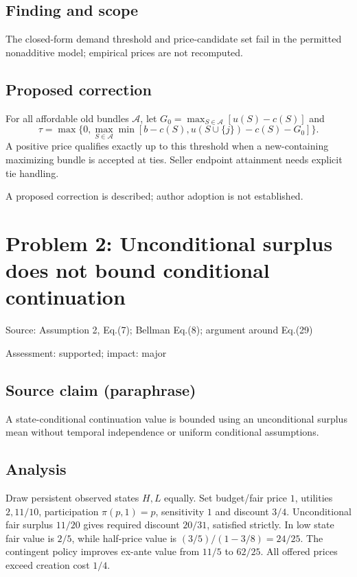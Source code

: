 \documentclass[11pt]{article}
\begin{document}
\subsection*{Finding and scope}

The closed-form demand threshold and price-candidate set fail in the permitted nonadditive model; empirical prices are not recomputed.

\subsection*{Proposed correction}

For all affordable old bundles \(\mathcal A\), let \(G_0=\max_{S\in\mathcal A}[u(S)-c(S)]\) and \[\tau=\max\{0,\max_{S\in\mathcal A}\min[b-c(S),u(S\cup\{j\})-c(S)-G_0]\}.\] A positive price qualifies exactly up to this threshold when a new-containing maximizing bundle is accepted at ties. Seller endpoint attainment needs explicit tie handling.

A proposed correction is described; author adoption is not established.

\section*{Problem 2: Unconditional surplus does not bound conditional continuation}

Source: Assumption 2, Eq.(7); Bellman Eq.(8); argument around Eq.(29)

Assessment: supported; impact: major

\subsection*{Source claim (paraphrase)}

A state-conditional continuation value is bounded using an unconditional surplus mean without temporal independence or uniform conditional assumptions.

\subsection*{Analysis}

Draw persistent observed states \(H,L\) equally. Set budget/fair price \(1\), utilities \(2,11/10\), participation \(\pi(p,1)=p\), sensitivity \(1\) and discount \(3/4\). Unconditional fair surplus \(11/20\) gives required discount \(20/31\), satisfied strictly. In low state fair value is \(2/5\), while half-price value is \((3/5)/(1-3/8)=24/25\). The contingent policy improves ex-ante value from \(11/5\) to \(62/25\). All offered prices exceed creation cost \(1/4\).
\end{document}
